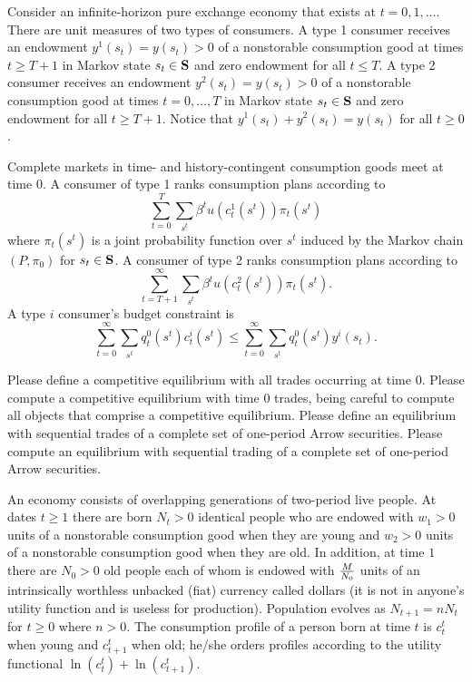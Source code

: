  Consider an infinite-horizon pure exchange economy that exists at $t=0, 1, \ldots $.
There are unit measures of  two types of consumers.
A type 1 consumer receives an endowment $y^1(s_t) = y(s_t) >0 $ of a nonstorable consumption good at times $t\geq T+1$
in Markov state $s_t \in {\bf S}$ and zero endowment for all $ t \leq T$.  A type 2 consumer receives an endowment $y^2(s_t) = y(s_t) >0$ of a nonstorable consumption good at times $t =0, \ldots, T$
in Markov state $s_t \in {\bf S}$ and zero endowment for all $t \geq T+1$.  Notice that $y^1(s_t) + y^2(s_t) = y(s_t)$ for all $t \geq 0$.

Complete markets in time- and  history-contingent consumption goods
meet at time $0$. A consumer of type 1  ranks consumption plans according to 
$$ \sum_{t=0}^T \sum_{s^t} \beta^t u(c_t^1(s^t)) \pi_t(s^t)$$
where $\pi_t(s^t)$ is a joint probability function over $s^t$ induced by the Markov chain $(P, \pi_0)$ for $s_t \in 
{\bf S}$.
A consumer of type 2 ranks consumption plans according to 
$$ \sum_{t=T+1}^\infty \sum_{s^t} \beta^t u(c_t^2(s^t)) \pi_t(s^t) .$$
A type $i$ consumer's budget constraint is
$$ \sum_{t=0}^\infty \sum_{s^t} q_t^0(s^t) c^i_t(s^t) \leq  \sum_{t=0}^\infty \sum_{s^t} q_t^0(s^t) y^i(s_t) . $$
 
\medskip
{} Please define a competitive equilibrium with all trades occurring at time $0$.
\medskip
{} Please compute a competitive equilibrium with time $0$ trades, being careful to compute
all objects that comprise a competitive equilibrium.
\medskip
{} Please define an equilibrium with sequential trades of a complete set of one-period Arrow  securities.
\medskip
{} Please compute an equilibrium with sequential trading of a complete set of one-period Arrow securities.

\bigskip

 An economy consists of overlapping generations of two-period live people. At dates $t \geq 1$ there are born
$N_t >0$ identical people who are endowed with $w_1 >0$ units of a nonstorable consumption good when they
are young and $w_2 >0 $ units of a nonstorable consumption good when they are old.  In addition, at time $1$ there
are $N_0> 0$ old people each of whom is endowed with ${M \over N_0}$ units of an intrinsically worthless unbacked (fiat) currency called
dollars (it is not in anyone's utility function and is useless for production).  
Population evolves as $N_{t+1} = n N_t$ for $t \geq 0$ where $n >0$.  The consumption profile
of a person born at time $t$ is $c_t^t$ when young and $c_{t+1}^t$ when old; he/she orders profiles according to the
utility functional
$ \ln (c_t^t) + \ln (c^t_{t+1}) .$

